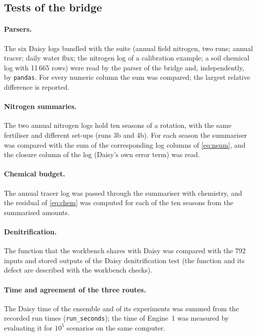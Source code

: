 \subsection{Tests of the bridge}
\paragraph{Parsers.} The six Daisy logs bundled with the suite (annual field nitrogen, two runs; annual tracer; daily water flux; the nitrogen log of a calibration example; a soil chemical log with 11\,665 rows) were read by the parser of the bridge and, independently, by \texttt{pandas}. For every numeric column the sum was compared; the largest relative difference is reported.

\paragraph{Nitrogen summaries.} The two annual nitrogen logs hold ten seasons of a rotation, with the same fertiliser and different set-ups (runs 3b and 4b). For each season the summariser was compared with the sum of the corresponding log columns of \cref{eq:nsum}, and the closure column of the log (Daisy's own error term) was read.

\paragraph{Chemical budget.} The annual tracer log was passed through the summariser with chemistry, and the residual of \cref{eq:chem} was computed for each of the ten seasons from the summarised amounts.

\paragraph{Denitrification.} The function that the workbench shares with Daisy was compared with the 792 inputs and stored outputs of the Daisy denitrification test (the function and its defect are described with the workbench checks).

\paragraph{Time and agreement of the three routes.} The Daisy time of the ensemble and of its experiments was summed from the recorded run times (\texttt{run\_seconds}); the time of Engine~1 was measured by evaluating it for $10^5$ scenarios on the same computer.


